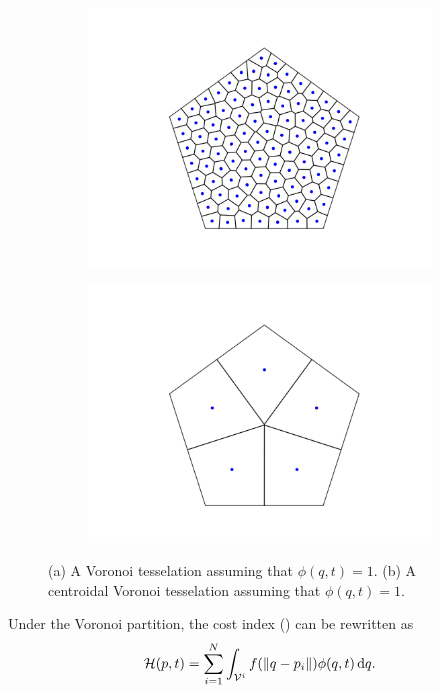 \documentclass[10pt,conference]{IEEEtran}
\begin{document}
		\begin{figure}
			\begin{subfigure}{0.2\textwidth}
				\centering 
				\includegraphics[scale=0.2]{fig_ex_2}
				\caption{}
			\end{subfigure}\hspace{\fill}
			\begin{subfigure}{0.2\textwidth}
				\centering 
				\includegraphics[scale=0.2]{fig_ex}
				\caption{}
			\end{subfigure}
			\caption{(a) A Voronoi tesselation assuming that $\phi(q,t) = 1$. (b) A centroidal Voronoi tesselation assuming that $\phi(q,t) = 1$.}
		\end{figure}
		\begin{prop}
			Under the Voronoi partition, the cost index () can be rewritten as
			\begin{equation}
				\label{rewritten cost index}
				\displaystyle \mathcal{H}(p,t) = \sum\limits_{i=1}^{N}{\int_{\V^i}{f(\,\norm{q - p_i})\phi(q,t) \dif q}}.
			\end{equation}
		\end{prop}
\end{document}
